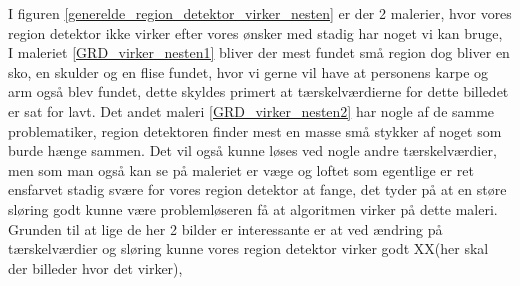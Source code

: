 I figuren \ref{generelde_region_detektor_virker_nesten} er der 2
malerier, hvor vores region detektor ikke virker efter vores ønsker med
stadig har noget vi kan bruge, I maleriet \ref{GRD_virker_nesten1}
bliver der mest fundet små region dog bliver en sko, en skulder og en
flise fundet, hvor vi gerne vil have at personens karpe og arm også blev
fundet, dette skyldes primert at tærskelværdierne for dette billedet er
sat for lavt. Det andet maleri \ref{GRD_virker_nesten2} har nogle af de
samme problematiker, region detektoren finder mest en masse små stykker
af noget som burde hænge sammen. Det vil også kunne løses ved nogle
andre tærskelværdier, men som man også kan se på maleriet er væge og
loftet som egentlige er ret ensfarvet stadig svære for vores region
detektor at fange, det tyder på at en støre sløring godt kunne være
problemløseren få at algoritmen virker på dette maleri. Grunden til at
lige de her 2 bilder er interessante er at ved ændring på tærskelværdier
og sløring kunne vores region detektor virker godt XX(her skal der
billeder hvor det virker), 

